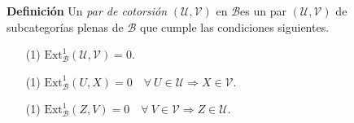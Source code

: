 \documentclass[preview]{standalone}
\begin{document}
\begin{center}
\justifying \textbf{Definición} Un \emph{par de cotorsión} $(\mathcal{U}, \mathcal{V})$ en $\mathscr{B}$es un par $(\mathcal{U}, \mathcal{V})$ de subcategorías plenas de $\mathscr{B}$ que cumple las condiciones siguientes.\begin{enumerate} \item[(1)] $\text{Ext}^1_\mathscr{B} (\mathcal{U}, \mathcal{V}) = 0$. \item[(1)] $\text{Ext}^1_\mathscr{B} (U, X) = 0 \quad \forall \ U\in\mathcal{U} \Rightarrow X\in\mathcal{V}$. \item[(1)] $\text{Ext}^1_\mathscr{B} (Z, V) = 0 \quad \forall \ V\in\mathcal{V} \Rightarrow Z\in\mathcal{U}$. \end{enumerate}
\end{center}
\end{document}
